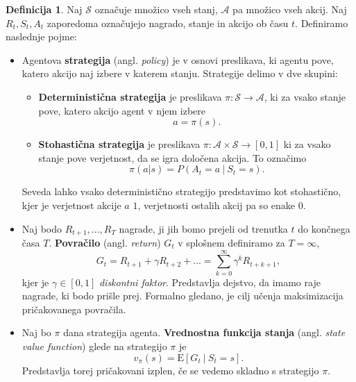 \documentclass[12pt,a4paper]{amsart}
\theoremstyle{definition} %
\newtheorem{definicija}{Definicija}[section]
\theoremstyle{plain} %
\begin{document}
\begin{definicija}
    Naj $\mathcal{S}$ označuje množico vseh stanj, $\mathcal{A}$ pa množico vseh akcij. Naj $R_t,
    S_t, A_t$ zaporedoma označujejo nagrado, stanje in akcijo ob času $t$. Definiramo naslednje 
    pojme: 
    \begin{itemize}
        \item   Agentova \textbf{strategija} (angl. \textit{policy}) je v osnovi preslikava, ki 
                agentu pove, katero akcijo naj izbere v katerem stanju. Strategije delimo v dve 
                skupini:
                \begin{itemize}
                    \item \textbf{Deterministična strategija} je preslikava $\pi: \mathcal{S} 
                    \rightarrow \mathcal{A}$, ki za vsako stanje pove, katero akcijo agent v njem 
                    izbere
                    $$
                    a = \pi(s).
                    $$
                    \item \textbf{Stohastična strategija} je preslikava $\pi: \mathcal{A} \times 
                    \mathcal{S} \rightarrow [0, 1]$ ki za vsako stanje pove verjetnost, da se igra 
                    določena akcija. To označimo 
                    $$
                    \pi(a | s) = P(A_t = a~|~S_t = s).
                    $$
                \end{itemize}
                Seveda lahko vsako deterministično strategijo predstavimo kot stohastično, kjer je 
                verjetnost akcije $a$ $1$, verjetnosti ostalih akcij pa so enake $0$.
        
        \item Naj bodo $R_{t+1}, ...,R_T$ nagrade, ji jih bomo prejeli od trenutka 
                $t$ do končnega časa $T$. \textbf{Povračilo} (angl. \textit{return}) $G_t$ v splošnem
                definiramo za $T=\infty$,
                $$
                G_t = R_{t+1} + \gamma R_{t+2} + ... = \sum_{k=0}^\infty \gamma^k R_{t + k + 1} ,
                $$
                kjer je $\gamma \in [0,1]$ \textit{diskontni faktor}. Predstavlja dejstvo, da 
                imamo raje nagrade, ki bodo prišle prej. Formalno gledano, je cilj učenja 
                maksimizacija pričakovanega povračila.

         \item Naj bo $\pi$ dana strategija agenta. \textbf{Vrednostna funkcija 
                stanja} (angl. \textit{state value function}) glede na strategijo $\pi$ je
                $$
                v_\pi(s) = \mathrm{E} [G_t~|~S_t = s].
                $$
                Predstavlja torej pričakovani izplen, če se vedemo skladno s strategijo $\pi$.


\end{itemize}
\end{definicija}
\end{document}
